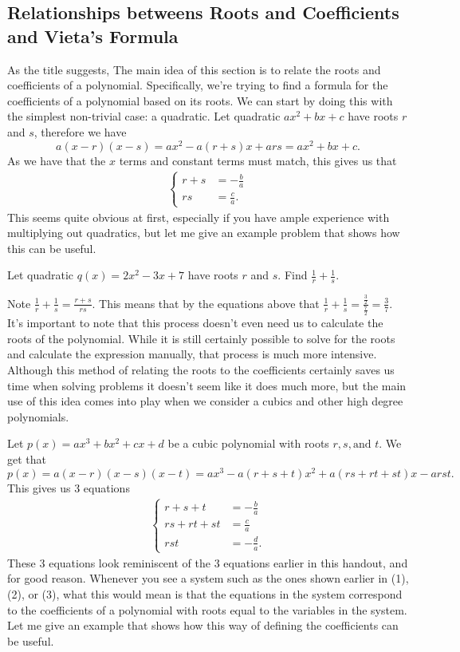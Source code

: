 \documentclass[11pt]{article}
\begin{document}
\subsection{Relationships betweens Roots and Coefficients and Vieta's Formula}
\par As the title suggests, The main idea of this section is to relate the roots and coefficients of a polynomial. Specifically, we're trying to find a formula for the coefficients of a polynomial based on its roots. We can start by doing this with the simplest non-trivial case: a quadratic. Let quadratic $ax^2+bx+c$ have roots $r$ and $s$, therefore we have
\[
a(x-r)(x-s) = ax^2 - a(r+s)x + ars = ax^2+bx+c.
\] As we have that the $x$ terms and constant terms must match, this gives us that
\begin{align}
    \begin{cases}
        r+s & = -\frac{b}{a} \\
        rs & = \frac{c}{a}.
    \end{cases}
\end{align}
This seems quite obvious at first, especially if you have ample experience with multiplying out quadratics, but let me give an example problem that shows how this can be useful.
\begin{example}
    Let quadratic $q(x) = 2x^2-3x+7$ have roots $r$ and $s$. Find $\frac{1}{r}+\frac{1}{s}$.
\end{example}
\par Note $\frac{1}{r} + \frac{1}{s} = \frac{r+s}{rs}$. This means that by the equations above that $\frac{1}{r} + \frac{1}{s} = \frac{\frac{3}{2}}{\frac{7}{2}} = \frac{3}{7}$. It's important to note that this process doesn't even need us to calculate the roots of the polynomial.
While it is still certainly possible to solve for the roots and calculate the expression manually, that process is much more intensive. Although this method of relating the roots to the coefficients certainly saves us time when solving problems it doesn't seem like it does much more, 
but the main use of this idea comes into play when we consider a cubics and other high degree polynomials.


\indent Let $p(x)=ax^3+bx^2+cx+d$ be a cubic polynomial with roots $r, s, \text{and } t$.
We get that
\[
p(x) = a(x-r)(x-s)(x-t) = ax^3 - a(r+s+t)x^2 + a(rs + rt + st)x - arst.
\] This gives us 3 equations
\begin{align}
    \begin{cases}
        r+s+t & = -\frac{b}{a} \\
        rs + rt + st &= \frac{c}{a} \\
        rst &= -\frac{d}{a}.
    \end{cases}
\end{align}
These 3 equations look reminiscent of the 3 equations earlier in this handout, and for good reason. Whenever you see a system such as the ones shown earlier in (1), (2), or (3), what this would mean is that the equations in the system correspond to the coefficients of a polynomial with
 roots equal to the variables in the system. Let me give an example that shows how this way of defining the coefficients can be useful.
\end{document}
